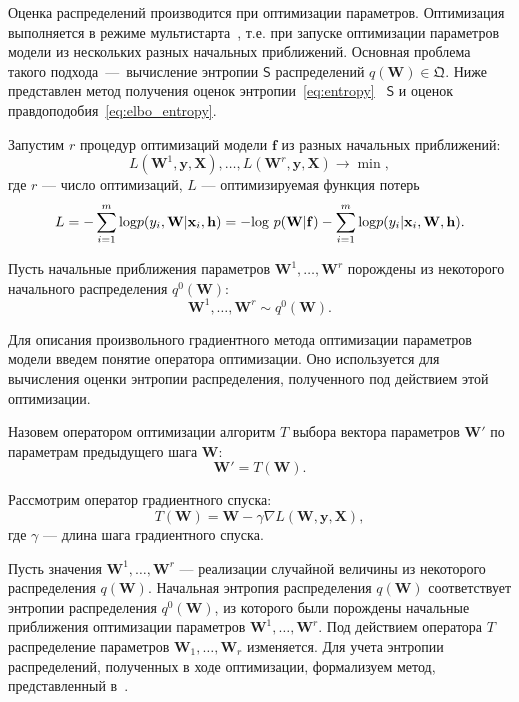 Оценка распределений производится при оптимизации параметров. Оптимизация выполняется в режиме мультистарта~\cite{multi}, т.е. при запуске оптимизации параметров модели из нескольких разных начальных приближений. Основная проблема такого подхода~---~вычисление энтропии $\mathsf{S}$ распределений $q(\mathbf{W}) \in \mathfrak{Q}$. Ниже представлен метод получения оценок энтропии~\eqref{eq:entropy} ~$\mathsf{S}$ и оценок правдоподобия~\eqref{eq:elbo_entropy}.

Запустим $r$ процедур оптимизаций модели $\mathbf{f}$ из разных начальных приближений:
\[
	L(\mathbf{W}^1, \mathbf{y}, \mathbf{X}), \dots, L(\mathbf{W}^r, \mathbf{y}, \mathbf{X}) \to \min,
\] 
где $r$ --- число оптимизаций, $L$ --- оптимизируемая функция потерь
\begin{equation}
\label{eq:loss_func}
L = -\sum_{i=1}^m \textnormal{log}p({y}_i, \mathbf{W} |\mathbf{x}_i,\mathbf{h}) = -\textnormal{log}~p(\mathbf{W}|\mathbf{f}) - \sum_{i=1}^m \textnormal{log}p({y}_i |\mathbf{x}_i, \mathbf{W},\mathbf{h}).
\end{equation}

Пусть начальные приближения параметров $\mathbf{W}^1, \dots, \mathbf{W}^r$ порождены из некоторого начального распределения $q^0(\mathbf{W})$:
\[
	\mathbf{W}^1, \dots, \mathbf{W}^r \sim q^0(\mathbf{W}). 
\]


Для описания произвольного градиентного метода оптимизации параметров модели введем понятие оператора оптимизации. Оно используется для вычисления оценки энтропии распределения, полученного под действием этой оптимизации.

\begin{defin}
Назовем оператором оптимизации алгоритм $T$ выбора вектора параметров $\mathbf{W}'$  по параметрам предыдущего шага $\mathbf{W}$:
\[
	\mathbf{W}' = T(\mathbf{W}).
\]
\end{defin}


Рассмотрим оператор градиентного спуска:
\begin{equation}
\label{eq:sgd}
	T(\mathbf{W}) = \mathbf{W} - \gamma \nabla L(\mathbf{W}, \mathbf{y}, \mathbf{X}), 
\end{equation}
где  $\gamma$ --- длина шага градиентного спуска.

Пусть значения $\mathbf{W}^1, \dots, \mathbf{W}^r$  --- реализации случайной величины из некоторого распределения $q(\mathbf{W})$. Начальная энтропия распределения $q(\mathbf{W})$ соответствует энтропии распределения $q^0(\mathbf{W})$, из которого были порождены начальные приближения оптимизации параметров $\mathbf{W}^1, \dots, \mathbf{W}^r$. Под действием оператора $T$ распределение параметров $\mathbf{W}_1, \dots, \mathbf{W}_r$ изменяется. Для учета энтропии распределений, полученных в ходе оптимизации,
{ формализуем метод,  представленный в~\cite{early}. }

